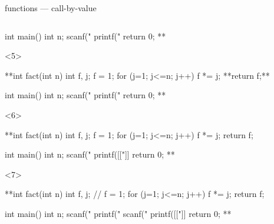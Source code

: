 \documentclass[10pt,t,svgnames]{beamer}
\begin{document}
\begin{frame}[fragile]{functions --- call-by-value}
\begin{columns}
\begin{column}{.65\textwidth}
\begin{scriptsize}
\begin{onlyenv}
\begin{codeblock}[firstnumber=5, gobble=8]
              int main() {
                int n;
                scanf("%
                printf("%
                return 0;
              }**
            \end{codeblock}
          \end{onlyenv}
          \begin{onlyenv}<5>
            \begin{codeblock}[firstnumber=5, gobble=8]
              **int fact(int n) {
                int f, j;
                f = 1;
                for (j=1; j<=n; j++) {
                  f *= j;
                }
                **return f;**
              }

              int main() {
                int n;
                scanf("%
                printf("%
                return 0;
              }**
            \end{codeblock}
          \end{onlyenv}
          \begin{onlyenv}<6>
            \begin{codeblock}[firstnumber=5, gobble=8]
              **int fact(int n) {
                int f, j;
                f = 1;
                for (j=1; j<=n; j++) {
                  f *= j;
                }
                return f;
              }

              int main() {
                int n;
                scanf("%
                printf([["]]%
                return 0;
              }**
            \end{codeblock}
          \end{onlyenv}
          \begin{onlyenv}<7>
            \begin{codeblock}[firstnumber=5, gobble=8]
              **int fact(int n) {
                int f, j;
                // f = 1;
                for (j=1; j<=n; j++) {
                  f *= j;
                }
                return f;
              }

              int main() {
                int n;
                scanf("%
                printf("%
                scanf("%
                printf([["]]%
                return 0;
              }**
            \end{codeblock}
          \end{onlyenv}
        \end{scriptsize}
      \end{column}


\end{columns}
\end{frame}
\end{document}
